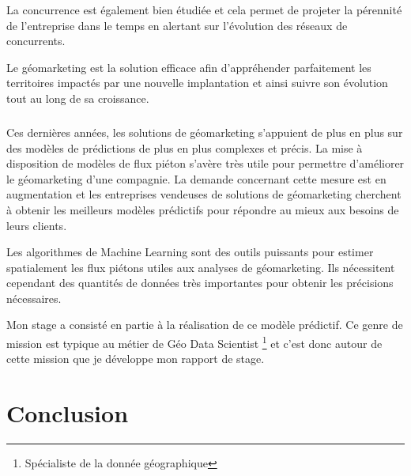 \documentclass{themeensg}
\begin{document}
La concurrence est également bien étudiée et cela permet de projeter la pérennité de l’entreprise dans le temps en alertant sur l’évolution des réseaux de concurrents.

Le géomarketing est la solution efficace afin d’appréhender parfaitement les territoires impactés par une nouvelle implantation et ainsi suivre son évolution tout au long de sa croissance.

\paragraph*{}

Ces dernières années, les solutions de géomarketing s’appuient de plus en plus sur des modèles de prédictions de plus en plus complexes et précis. La mise à disposition de modèles de flux piéton s’avère très utile pour permettre d’améliorer le géomarketing d’une compagnie. La demande concernant cette mesure est en augmentation et les entreprises vendeuses de solutions de géomarketing cherchent à obtenir les meilleurs modèles prédictifs pour répondre au mieux aux besoins de leurs clients.

Les algorithmes de Machine Learning sont des outils puissants pour estimer spatialement les flux piétons utiles aux analyses de géomarketing. Ils nécessitent cependant des quantités de données très importantes pour obtenir les précisions nécessaires.

Mon stage a consisté en partie à la réalisation de ce modèle prédictif. Ce genre de mission est typique au métier de Géo Data Scientist \footnote{Spécialiste de la donnée géographique} et c’est donc autour de cette mission que je développe mon rapport de stage.











\chapter*{Conclusion}
  \vspace{1.5cm}
\end{document}
